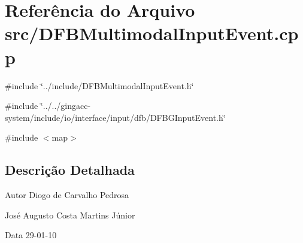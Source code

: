 \section{Referência do Arquivo src/DFBMultimodalInputEvent.cpp}
\label{DFBMultimodalInputEvent_8cpp}
{\ttfamily \#include \char`\"{}../include/DFBMultimodalInputEvent.h\char`\"{}}\par
{\ttfamily \#include \char`\"{}../../gingacc-\/system/include/io/interface/input/dfb/DFBGInputEvent.h\char`\"{}}\par
{\ttfamily \#include $<$map$>$}\par


\subsection{Descrição Detalhada}
\begin{DoxyAuthor}{Autor}
Diogo de Carvalho Pedrosa 

José Augusto Costa Martins Júnior 
\end{DoxyAuthor}
\begin{DoxyDate}{Data}
29-\/01-\/10 
\end{DoxyDate}
